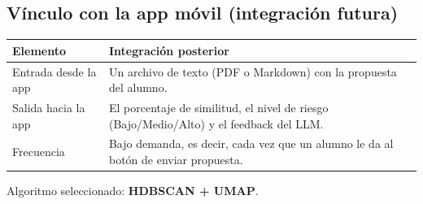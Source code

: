 \subsection{Vínculo con la app móvil (integración futura)}

\begin{tabular}{@{}p{3.5cm}p{9cm}@{}}
  \toprule
  Elemento & Integración posterior \\
  \midrule
  Entrada desde la app & Un archivo de texto (PDF o Markdown) con la propuesta del alumno. \\
  Salida hacia la app & El porcentaje de similitud, el nivel de riesgo (Bajo/Medio/Alto) y el feedback del LLM. \\
  Frecuencia & Bajo demanda, es decir, cada vez que un alumno le da al botón de enviar propuesta. \\
  \bottomrule
\end{tabular}

Algoritmo seleccionado: \textbf{HDBSCAN + UMAP}.
